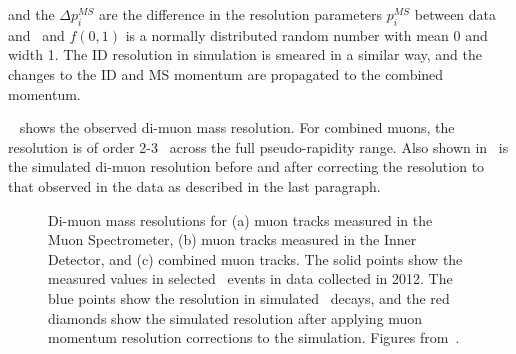 and the $ \Delta p_{i}^{MS} $ are the difference in the resolution parameters $
p_{i}^{MS} $ between data and \mcsim\ and $f(0,1)$ is a normally distributed
random number with mean 0 and width 1. The ID resolution in simulation is
smeared in a similar way, and the changes to the ID and MS momentum are propagated
to the combined momentum.



~ shows the observed di-muon mass resolution. For
combined muons, the resolution is of order 2-3 \gev\ across the full
pseudo-rapidity range. Also shown in~ is the simulated
di-muon resolution before and after correcting the resolution to that observed
in the data as described in the last paragraph.

\begin{figure}[h]
\centering
\caption[Di-muon mass resolutions for muon tracks measured in the Muon
Spectrometer, muon tracks measured in the Inner Detector, and combined muon
tracks. ]{Di-muon mass resolutions for (a) muon tracks measured in the Muon
Spectrometer, (b) muon tracks measured in the Inner Detector, and (c) combined muon
tracks. The solid points show the measured values in selected \Zmm\ events in data collected in 2012. The
blue points show the resolution in simulated \Zmm\ decays, and the red diamonds
show the simulated resolution after applying muon momentum resolution corrections to the simulation. Figures from~\cite{MuonPerfPlots2012}.}
\label{fig:mu-resolution-dimu}
\end{figure}

